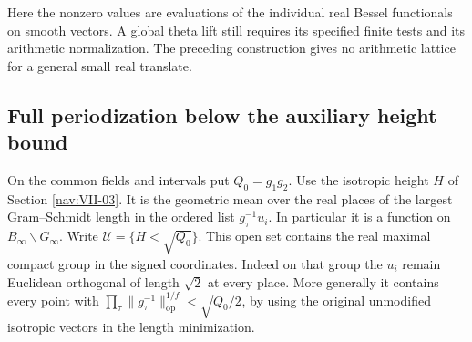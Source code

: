 \documentclass[a4paper,11pt]{article}
\theoremstyle{definition}
\theoremstyle{remark}
\numberwithin{equation}{section}
\begin{document}
Here the nonzero values are evaluations of the individual real
Bessel functionals on smooth vectors. A global theta lift still
requires its specified finite tests and its arithmetic normalization.
The preceding construction gives no arithmetic lattice for a
general small real translate.

\subsection{Full periodization below the auxiliary height bound}\label{nav:VII-20}
On the common fields and intervals put \(Q_0=g_1g_2\).
Use the isotropic height \(H\) of
Section \ref{nav:VII-03}.
It is the geometric mean over the real places of the largest
Gram--Schmidt length in the ordered list \(g_\tau^{-1}u_i\).
In particular it is a function on \(B_\infty\backslash G_\infty\).
Write \(\mathcal U=\{H<\sqrt{Q_0}\}\). This open set contains
the real maximal compact group in the signed coordinates. Indeed
on that group the \(u_i\) remain Euclidean orthogonal of length
\(\sqrt{2}\) at every place. More generally it contains every
point with \(\prod_\tau\|g_\tau^{-1}\|_{\mathrm{op}}^{1/f}
<\sqrt{Q_0/2}\), by using the original unmodified isotropic
vectors in the length minimization.
\end{document}
